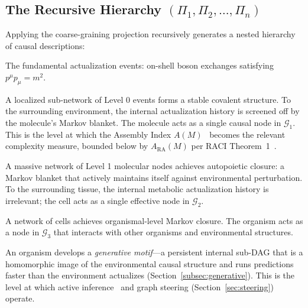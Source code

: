 \documentclass[11pt,a4paper]{article}
\theoremstyle{remark}
\newcommand{\ARA}{A_{\mathrm{RA}}}
\newcommand{\GG}{\mathcal{G}}
\begin{document}
\subsection{The Recursive Hierarchy $(\Pi_1, \Pi_2, \ldots, \Pi_n)$}

Applying the coarse-graining projection recursively generates a nested hierarchy
of causal descriptions:

\begin{description}[leftmargin=1.5em]
  \item[\textbf{Level 0} ($\GG_0$)] The fundamental actualization events: on-shell
    boson exchanges satisfying $p^{\mu}p_{\mu} = m^2$.

  \item[\textbf{Level 1} ($\Pi_1 \to \GG_1$, \textit{Chemistry})] A localized
    sub-network of Level 0 events forms a stable covalent structure. To the
    surrounding environment, the internal actualization history is screened off
    by the molecule's Markov blanket. The molecule acts as a single causal
    node in $\GG_1$. This is the level at which the Assembly Index
    $A(M)$~\citep{Murray2023} becomes the relevant complexity measure, bounded
    below by $\ARA(M)$ per RACI Theorem~1~\citep{Sandeman2026c}.

  \item[\textbf{Level 2} ($\Pi_2 \to \GG_2$, \textit{Cells})] A massive network
    of Level 1 molecular nodes achieves autopoietic closure: a Markov blanket
    that actively maintains itself against environmental perturbation. To the
    surrounding tissue, the internal metabolic actualization history is
    irrelevant; the cell acts as a single effective node in $\GG_2$.

  \item[\textbf{Level 3} ($\Pi_3 \to \GG_3$, \textit{Organisms})] A network of
    cells achieves organismal-level Markov closure. The organism acts as a node
    in $\GG_3$ that interacts with other organisms and environmental structures.

  \item[\textbf{Level 4} ($\Pi_4 \to \GG_4$, \textit{Agentic Intelligence})]
    An organism develops a \emph{generative motif}---a persistent internal
    sub-DAG that is a homomorphic image of the environmental causal structure
    and runs predictions faster than the environment actualizes
    (Section~\ref{subsec:generative}). This is the level at which active
    inference~\citep{Friston2010} and graph steering (Section~\ref{sec:steering})
    operate.
\end{description}
\end{document}
